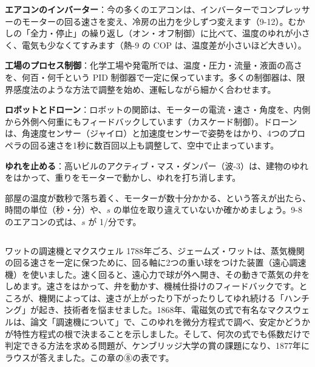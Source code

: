 \begin{phkougaku}[身の周りと工場の制御]
\textbf{エアコンのインバーター}：今の多くのエアコンは、インバーターでコンプレッサーのモーターの回る速さを変え、冷房の出力を少しずつ変えます（9-12）。むかしの「全力・停止」の繰り返し（オン・オフ制御）に比べて、温度のゆれが小さく、電気も少なくてすみます（熱-9 の COP は、温度差が小さいほど大きい）。

\textbf{工場のプロセス制御}：化学工場や発電所では、温度・圧力・流量・液面の高さを、何百・何千という PID 制御器で一定に保っています。多くの制御器は、限界感度法のような方法で調整を始め、運転しながら細かく合わせます。

\textbf{ロボットとドローン}：ロボットの関節は、モーターの電流・速さ・角度を、内側から外側へ何重にもフィードバックしています（カスケード制御）。ドローンは、角速度センサー（ジャイロ）と加速度センサーで姿勢をはかり、4つのプロペラの回る速さを1秒に数百回以上も調整して、空中で止まっています。

\textbf{ゆれを止める}：高いビルのアクティブ・マス・ダンパー（波-3）は、建物のゆれをはかって、重りをモーターで動かし、ゆれを打ち消します。

\begin{phketa}[制御の数の目安]
部屋の温度が数秒で落ち着く、モーターが数十分かかる、という答えが出たら、時間の単位（秒・分）や、$s$ の単位を取り違えていないか確かめましょう。9-8 のエアコンの式は、$s$ が 1/分です。
\end{phketa}
\end{phkougaku}

\begin{column}{ワットの調速機とマクスウェル}
1788年ごろ、ジェームズ・ワットは、蒸気機関の回る速さを一定に保つために、回る軸に2つの重い球をつけた装置（遠心調速機）を使いました。速く回ると、遠心力で球が外へ開き、その動きで蒸気の弁をしめます。速さをはかって、弁を動かす、機械仕掛けのフィードバックです。ところが、機関によっては、速さが上がったり下がったりしてゆれ続ける「ハンチング」が起き、技術者を悩ませました。1868年、電磁気の式で有名なマクスウェルは、論文「調速機について」で、このゆれを微分方程式で調べ、安定かどうかが特性方程式の根で決まることを示しました。そして、何次の式でも係数だけで判定できる方法を求める問題が、ケンブリッジ大学の賞の課題になり、1877年にラウスが答えました。この章の⑧の表です。
\end{column}

